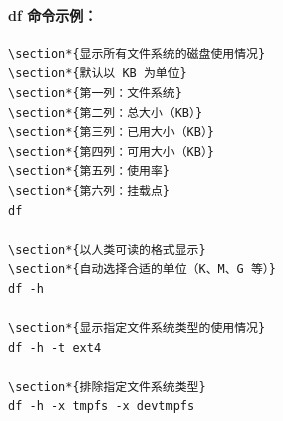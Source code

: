 \documentclass[12pt,UTF8]{ctexbook}
\begin{document}
\paragraph{df 命令示例：}
\begin{verbatim}
\section*{显示所有文件系统的磁盘使用情况}
\section*{默认以 KB 为单位}
\section*{第一列：文件系统}
\section*{第二列：总大小（KB）}
\section*{第三列：已用大小（KB）}
\section*{第四列：可用大小（KB）}
\section*{第五列：使用率}
\section*{第六列：挂载点}
df

\section*{以人类可读的格式显示}
\section*{自动选择合适的单位（K、M、G 等）}
df -h

\section*{显示指定文件系统类型的使用情况}
df -h -t ext4

\section*{排除指定文件系统类型}
df -h -x tmpfs -x devtmpfs


\end{verbatim}
\end{document}
